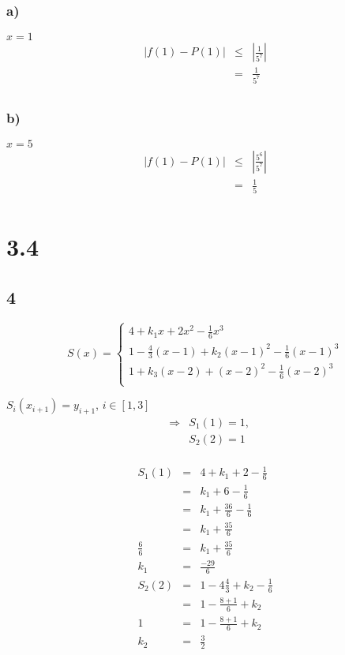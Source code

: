 \documentclass[12pt]{article}
\begin{document}
\subsubsection*{a)}
\(x = 1\)
\begin{eqnarray*}
  |f(1) - P(1)| & \leq & \left|\frac{1}{5^{7}}\right|\\
  & = & \frac{1}{5^7}\\
\end{eqnarray*}
\subsubsection*{b)}
\(x = 5\)
\begin{eqnarray*}
  |f(1) - P(1)| & \leq & \left|\frac{5^6}{5^{7}}\right|\\
  & = & \frac{1}{5}\\
\end{eqnarray*}

\section*{3.4}
\subsection*{4}
\begin{displaymath}
  S(x) = \left\{
  \begin{array}{lr}
    4 + k_1x + 2x^2 - \frac{1}{6}x^3 \\
    1 - \frac{4}{3}(x-1) + k_2(x-1)^2 - \frac{1}{6}(x-1)^3\\
    1 + k_3(x-2) + (x-2)^2 - \frac{1}{6}(x-2)^3\\
    \end{array}
  \right.
\end{displaymath}

\(S_i(x_{i+1}) = y_{i+1}\), \(i \in [1,3]\)
\begin{eqnarray*}
  &\Rightarrow & S_1(1) = 1,\\
  & & S_2(2) = 1\\
\end{eqnarray*}

\begin{eqnarray*}
  S_1(1) & = & 4 + k_1 + 2 - \frac{1}{6}\\
  & = & k_1 + 6 - \frac{1}{6}\\
  & = & k_1 + \frac{36}{6} - \frac{1}{6}\\
  & = & k_1 + \frac{35}{6}\\
  \frac{6}{6} & = & k_1 + \frac{35}{6}\\
  k_1 & = & \frac{-29}{6}\\
  S_2(2) & = & 1 -4 \frac{4}{3} + k_2 - \frac{1}{6}\\
  & = & 1 - \frac{8+1}{6} + k_2\\
  1 & = & 1 - \frac{8+1}{6} + k_2\\
  k_2 & = & \frac{3}{2}\\
\end{eqnarray*}
\end{document}
